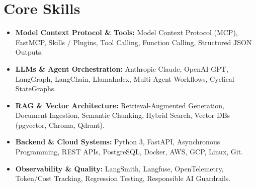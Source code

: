 \documentclass[a4paper,10pt]{article}
\begin{document}
\section{Core Skills}
\begin{itemize}
  \item \textbf{Model Context Protocol \& Tools:} Model Context Protocol (MCP), FastMCP, Skills / Plugins, Tool Calling, Function Calling, Structured JSON Outputs.
  \item \textbf{LLMs \& Agent Orchestration:} Anthropic Claude, OpenAI GPT, LangGraph, LangChain, LlamaIndex, Multi-Agent Workflows, Cyclical StateGraphs.
  \item \textbf{RAG \& Vector Architecture:} Retrieval-Augmented Generation, Document Ingestion, Semantic Chunking, Hybrid Search, Vector DBs (pgvector, Chroma, Qdrant).
  \item \textbf{Backend \& Cloud Systems:} Python 3, FastAPI, Asynchronous Programming, REST APIs, PostgreSQL, Docker, AWS, GCP, Linux, Git.
  \item \textbf{Observability \& Quality:} LangSmith, Langfuse, OpenTelemetry, Token/Cost Tracking, Regression Testing, Responsible AI Guardrails.
\end{itemize}
\end{document}
